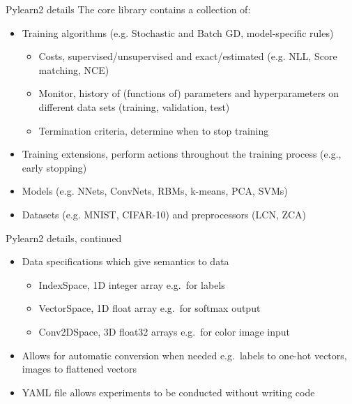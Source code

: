 \documentclass[utf8x,xcolor=pdftex,dvipsnames,table]{beamer}
\begin{document}
\begin{frame}{Pylearn2 details}
    The core library contains a collection of:
    \begin{itemize}
      \item Training algorithms (e.g. Stochastic and Batch GD, model-specific rules)
      \begin{itemize}
        \item Costs, supervised/unsupervised and exact/estimated (e.g. NLL, Score matching, NCE)
        \item Monitor, history of (functions of) parameters and hyperparameters on different data sets (training, validation, test)
        \item Termination criteria, determine when to stop training
      \end{itemize}
      \item Training extensions, perform actions throughout the training process (e.g., early stopping)
      \item Models (e.g. NNets, ConvNets, RBMs, k-means, PCA, SVMs)
      \item Datasets (e.g. MNIST, CIFAR-10) and preprocessors (LCN, ZCA)
    \end{itemize}
\end{frame}

\begin{frame}{Pylearn2 details, continued}
\begin{itemize}
  \item Data specifications which give semantics to data
  \begin{itemize}
    \item IndexSpace, 1D integer array e.g.\ for labels
    \item VectorSpace, 1D float array e.g.\ for softmax output
    \item Conv2DSpace, 3D float32 arrays e.g.\ for color image input
  \end{itemize}
  \item Allows for automatic conversion when needed e.g.\ labels to one-hot vectors, images to flattened vectors
  \item YAML file allows experiments to be conducted without writing code
\end{itemize}
\end{frame}
\end{document}
